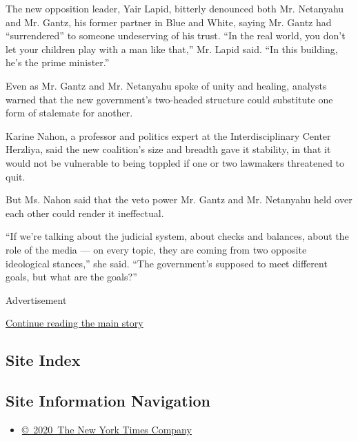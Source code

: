 The new opposition leader, Yair Lapid, bitterly denounced both Mr.
Netanyahu and Mr. Gantz, his former partner in Blue and White, saying
Mr. Gantz had ``surrendered'' to someone undeserving of his trust. ``In
the real world, you don't let your children play with a man like that,''
Mr. Lapid said. ``In this building, he's the prime minister.''

Even as Mr. Gantz and Mr. Netanyahu spoke of unity and healing, analysts
warned that the new government's two-headed structure could substitute
one form of stalemate for another.

Karine Nahon, a professor and politics expert at the Interdisciplinary
Center Herzliya, said the new coalition's size and breadth gave it
stability, in that it would not be vulnerable to being toppled if one or
two lawmakers threatened to quit.

But Ms. Nahon said that the veto power Mr. Gantz and Mr. Netanyahu held
over each other could render it ineffectual.

``If we're talking about the judicial system, about checks and balances,
about the role of the media --- on every topic, they are coming from two
opposite ideological stances,'' she said. ``The government's supposed to
meet different goals, but what are the goals?''

Advertisement

\protect\hyperlink{after-bottom}{Continue reading the main story}

\hypertarget{site-index}{%
\subsection{Site Index}\label{site-index}}

\hypertarget{site-information-navigation}{%
\subsection{Site Information
Navigation}\label{site-information-navigation}}

\begin{itemize}
\tightlist
\item
  \href{https://help.nytimes.com/hc/en-us/articles/115014792127-Copyright-notice}{©~2020~The
  New York Times Company}
\end{itemize}

